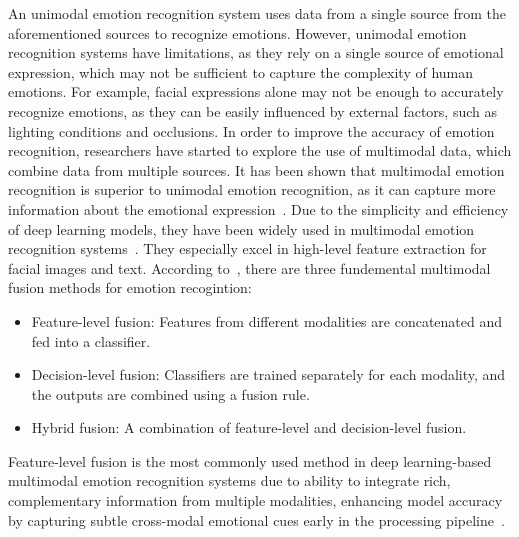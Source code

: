 \documentclass{article}
\begin{document}
An unimodal emotion recognition system uses data from a single source from the
aforementioned sources to recognize emotions. However, unimodal emotion recognition systems
have limitations, as they rely on a single source of emotional expression, which may not be
sufficient to capture the complexity of human emotions. For example, facial expressions
alone may not be enough to accurately recognize emotions, as they can be easily influenced
by external factors, such as lighting conditions and occlusions. In order to improve the accuracy of
emotion recognition, researchers have started to explore the use of multimodal data, which
combine data from multiple sources. It has been shown that multimodal emotion recognition
is superior to unimodal emotion recognition, as it can capture more information about the
emotional expression~\cite{multimodal-review, unimodal-to-multimodal}. Due to the
simplicity and efficiency of deep learning models, they have been widely used in multimodal
emotion recognition systems~\cite{multimodal-review, unimodal-to-multimodal}. They
especially excel in high-level feature extraction for facial images and text.
According to~\cite{multimodal-review},
there are three fundemental multimodal fusion methods for emotion recogintion:
\begin{itemize}
    \item Feature-level fusion: Features from different modalities are concatenated and fed into a classifier.
    \item Decision-level fusion: Classifiers are trained separately for each modality,
    and the outputs are combined using a fusion rule.
    \item Hybrid fusion: A combination of feature-level and decision-level fusion.
\end{itemize}
Feature-level fusion is the most commonly used method in deep learning-based
multimodal emotion recognition systems due to ability to integrate rich, complementary information
from multiple modalities, enhancing model accuracy by capturing subtle cross-modal emotional
cues early in the processing pipeline~\cite{multimodal-review}.


\printbibliography[heading=bibintoc]

%     
\end{document}
